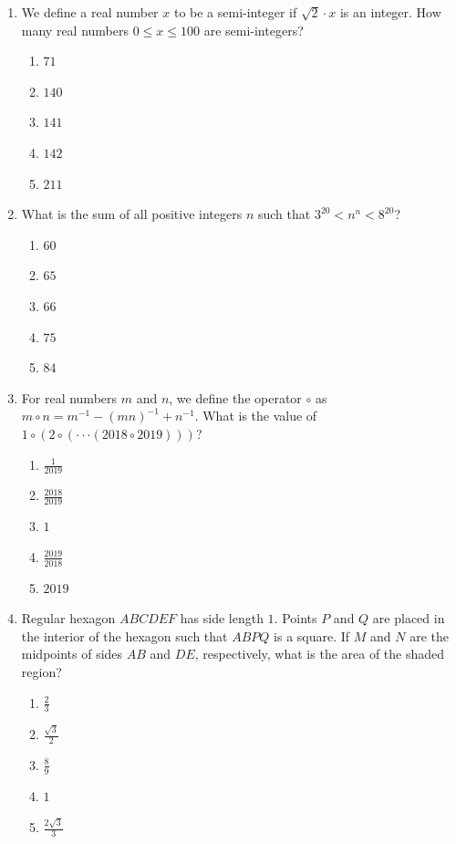 \documentclass{article}
\begin{document}
\begin{enumerate}
\item We define a real number $x$ to be a semi-integer if $\sqrt{2}\cdot x$ is an integer. How many real numbers $0\le x\le100$ are semi-integers?
\begin{enumerate}
    \item $71$
    \item $140$
    \item $141$
    \item $142$
    \item $211$
\end{enumerate}

\item What is the sum of all positive integers $n$ such that $3^{20}<n^{n}<8^{20}$?
\begin{enumerate}
    \item $60$
    \item $65$
    \item $66$
    \item $75$
    \item $84$
\end{enumerate}

\item For real numbers $m$ and $n$, we define the operator $\circ$ as $m\circ n = m^{-1}-(mn)^{-1}+n^{-1}$. What is the value of $1\circ(2\circ(\cdot\cdot\cdot(2018\circ2019)))$?
\begin{enumerate}
    \item $\frac{1}{2019}$
    \item $\frac{2018}{2019}$
    \item $1$
    \item $\frac{2019}{2018}$
    \item $2019$
\end{enumerate}

\item Regular hexagon $ABCDEF$ has side length $1$. Points $P$ and $Q$ are placed in the interior of the hexagon such that $ABPQ$ is a square. If $M$ and $N$ are the midpoints of sides $AB$ and $DE$, respectively, what is the area of the shaded region?
\begin{enumerate}
    \item $\frac{2}{3}$
    \item $\frac{\sqrt{3}}{2}$
    \item $\frac{8}{9}$
    \item $1$
    \item $\frac{2\sqrt{3}}{3}$
\end{enumerate}


\end{enumerate}
\end{document}

